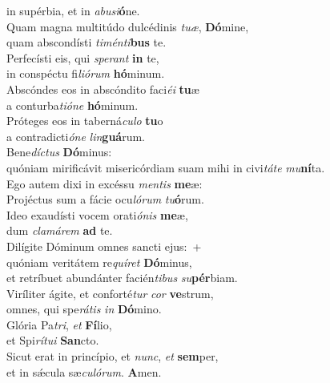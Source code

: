 \evenverse in supérbia, et in \textit{a}\textit{bu}\textit{si}\textbf{ó}ne.\\
\oddverse Quam magna multitúdo dulcédinis \textit{tu}\textit{æ}, \textbf{Dó}mine,~\*\\
\oddverse quam abscondísti \textit{ti}\textit{mén}\textit{ti}\textbf{bus} te.\\
\evenverse Perfecísti eis, qui \textit{spe}\textit{rant} \textbf{in} te,~\*\\
\evenverse in conspéctu fi\textit{li}\textit{ó}\textit{rum} \textbf{hó}minum.\\
\oddverse Abscóndes eos in abscóndito faci\textit{é}\textit{i} \textbf{tu}æ~\*\\
\oddverse a conturba\textit{ti}\textit{ó}\textit{ne} \textbf{hó}minum.\\
\evenverse Próteges eos in taberná\textit{cu}\textit{lo} \textbf{tu}o~\*\\
\evenverse a contradicti\textit{ó}\textit{ne} \textit{lin}\textbf{guá}rum.\\
\oddverse Bene\textit{dí}\textit{ctus} \textbf{Dó}minus:~\*\\
\oddverse quóniam mirificávit misericórdiam suam mihi in civi\textit{tá}\textit{te} \textit{mu}\textbf{ní}ta.\\
\evenverse Ego autem dixi in excéssu \textit{men}\textit{tis} \textbf{me}æ:~\*\\
\evenverse Projéctus sum a fácie ocu\textit{ló}\textit{rum} \textit{tu}\textbf{ó}rum.\\
\oddverse Ideo exaudísti vocem orati\textit{ó}\textit{nis} \textbf{me}æ,~\*\\
\oddverse dum \textit{cla}\textit{má}\textit{rem} \textbf{ad} te.\\
\evenverse Dilígite Dóminum omnes sancti ejus:~+\\
\evenverse  quóniam veritátem re\textit{quí}\textit{ret} \textbf{Dó}minus,~\*\\
\evenverse et retríbuet abundánter facién\textit{ti}\textit{bus} \textit{su}\textbf{pér}biam.\\
\oddverse Viríliter ágite, et conforté\textit{tur} \textit{cor} \textbf{ve}strum,~\*\\
\oddverse omnes, qui spe\textit{rá}\textit{tis} \textit{in} \textbf{Dó}mino.\\
\evenverse Glória Pa\textit{tri}, \textit{et} \textbf{Fí}lio,~\*\\
\evenverse et Spi\textit{rí}\textit{tu}\textit{i} \textbf{San}cto.\\
\oddverse Sicut erat in princípio, et \textit{nunc}, \textit{et} \textbf{sem}per,~\*\\
\oddverse et in sǽcula sæ\textit{cu}\textit{ló}\textit{rum}. \textbf{A}men.\\
